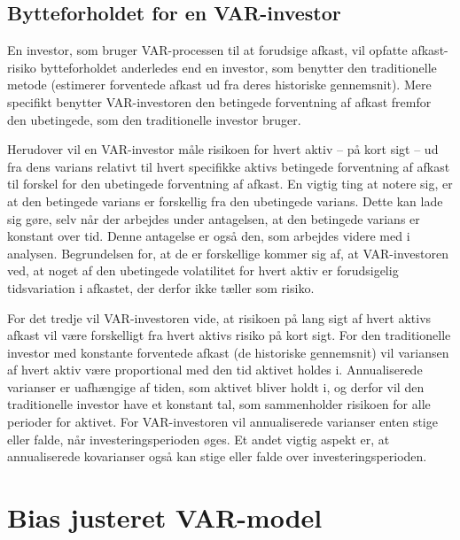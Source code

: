 \documentclass[
  a4paper,
  oneside]{memoir}
\begin{document}
\subsection{Bytteforholdet for en VAR-investor}

En investor, som bruger VAR-processen til at forudsige afkast, vil opfatte afkast-risiko bytteforholdet anderledes end en investor, som benytter den traditionelle metode (estimerer forventede afkast ud fra deres historiske gennemsnit). Mere specifikt benytter VAR-investoren den betingede forventning af afkast fremfor den ubetingede, som den traditionelle investor bruger.

Herudover vil en VAR-investor måle risikoen for hvert aktiv -- på kort sigt -- ud fra dens varians relativt til hvert specifikke aktivs betingede forventning af afkast til forskel for den ubetingede forventning af afkast. En vigtig ting at notere sig, er at den betingede varians er forskellig fra den ubetingede varians. Dette kan lade sig gøre, selv når der arbejdes under antagelsen, at den betingede varians er konstant over tid. Denne antagelse er også den, som arbejdes videre med i analysen. Begrundelsen for, at de er forskellige kommer sig af, at VAR-investoren ved, at noget af den ubetingede volatilitet for hvert aktiv er forudsigelig tidsvariation i afkastet, der derfor ikke tæller som risiko.

For det tredje vil VAR-investoren vide, at risikoen på lang sigt af hvert aktivs afkast vil være forskelligt fra hvert aktivs risiko på kort sigt. For den traditionelle investor med konstante forventede afkast (de historiske gennemsnit) vil variansen af hvert aktiv være proportional med den tid aktivet holdes i. Annualiserede varianser er uafhængige af tiden, som aktivet bliver holdt i, og derfor vil den traditionelle investor have et konstant tal, som sammenholder risikoen for alle perioder for aktivet. For VAR-investoren vil annualiserede varianser enten stige eller falde, når investeringsperioden øges. Et andet vigtig aspekt er, at annualiserede kovarianser også kan stige eller falde over investeringsperioden.

\hypertarget{biasadjvar}{%
\section{Bias justeret VAR-model}\label{biasadjvar}}
\end{document}
